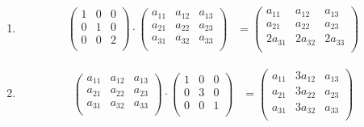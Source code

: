 \documentclass{article}
\begin{document}
\begin{enumerate}
    \item \begin{align*}
        \begin{pmatrix}
            1 & 0 & 0 \\
            0 & 1 & 0 \\
            0 & 0 & 2 \\
        \end{pmatrix} \cdot \begin{pmatrix}
            a_{11} & a_{12} & a_{13} \\
            a_{21} & a_{22} & a_{23} \\
            a_{31} & a_{32} & a_{33} \\
        \end{pmatrix} &= \begin{pmatrix}
            a_{11} & a_{12} & a_{13} \\
            a_{21} & a_{22} & a_{23} \\
            2a_{31} & 2a_{32} & 2a_{33} \\
        \end{pmatrix}
    \end{align*}

    \item \begin{align*}
        \begin{pmatrix}
            a_{11} & a_{12} & a_{13} \\
            a_{21} & a_{22} & a_{23} \\
            a_{31} & a_{32} & a_{33} \\
        \end{pmatrix} \cdot \begin{pmatrix}
            1 & 0 & 0 \\
            0 & 3 & 0 \\
            0 & 0 & 1 \\
        \end{pmatrix} &= \begin{pmatrix}
            a_{11} & 3a_{12} & a_{13} \\
            a_{21} & 3a_{22} & a_{23} \\
            a_{31} & 3a_{32} & a_{33} \\
        \end{pmatrix}
    \end{align*}


\end{enumerate}
\end{document}

